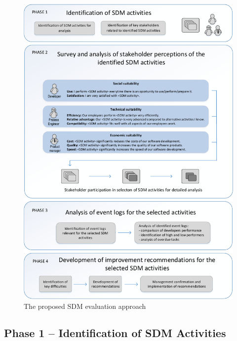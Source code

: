\begin{figure}
	\centering
	\includegraphics[width=\linewidth]{figures/sdm-latest}
	\caption{The proposed SDM evaluation approach}
	\label{fig:sdm-approach}
\end{figure}


\subsection{Phase 1 – Identification of SDM Activities}

